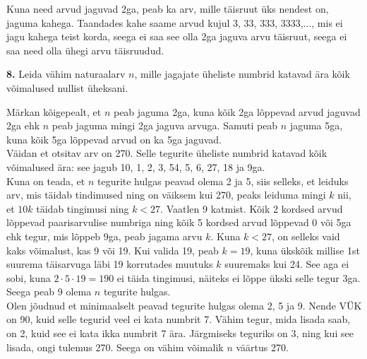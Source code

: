 \documentclass[a4paper, 10pt]{article}
\begin{document}
\bigskip
Kuna need arvud jaguvad 2ga, peab ka arv, mille täisruut üks nendest on, jaguma kahega. Taandades kahe saame arvud kujul 3, 33, 333, 3333,..., mis ei jagu kahega teist korda, seega ei saa see olla 2ga jaguva arvu täisruut, seega ei saa need olla ühegi arvu täisruudud.
\bigskip

\noindent\textbf{8.} Leida vähim naturaalarv $n$, mille jagajate üheliste numbrid katavad ära kõik võimalused nullist üheksani.

\bigskip

Märkan kõigepealt, et $n$ peab jaguma 2ga, kuna kõik 2ga lõppevad arvud jaguvad 2ga ehk $n$ peab jaguma mingi 2ga jaguva arvuga. Samuti peab $n$ jaguma 5ga, kuna kõik 5ga lõppevad arvud on ka 5ga jaguvad.\\
Väidan et otsitav arv on 270. Selle tegurite üheliste numbrid katavad kõik võimalused ära: see jagub 10, 1, 2, 3, 54, 5, 6, 27, 18 ja 9ga.\\
Kuna on teada, et $n$ tegurite hulgas peavad olema 2 ja 5, siis selleks, et leiduks arv, mis täidab tindimused ning on väiksem kui 270, peaks leiduma mingi $k$ nii, et $10k$ täidab tingimusi ning $k<27$. Vaatlen 9 katmist. Kõik 2 kordsed arvud lõppevad paarisarvulise numbriga ning kõik 5 kordsed arvud lõppevad 0 või 5ga ehk tegur, mis lõppeb 9ga, peab jagama arvu $k$. Kuna $k<27$, on selleks vaid kaks võimalust, kas 9 või 19. Kui valida 19, peab $k=19$, kuna ükskõik millise 1st suurema täisarvuga läbi 19 korrutades muutuks $k$ suuremaks kui 24. See aga ei sobi, kuna $2\cdot5\cdot19=190$ ei täida tingimusi, näiteks ei lõppe ükski selle tegur 3ga. Seega peab 9 olema $n$ tegurite hulgas.\\
Olen jõudnud et minimaalselt peavad tegurite hulgas olema 2, 5 ja 9. Nende VÜK on 90, kuid selle tegurid veel ei kata numbrit 7. Vähim tegur, mida lisada saab, on 2, kuid see ei kata ikka numbrit 7 ära. Järgmiseks teguriks on 3, ning kui see lisada, ongi tulemus 270. Seega on vähim võimalik $n$ väärtus 270.
\end{document}
